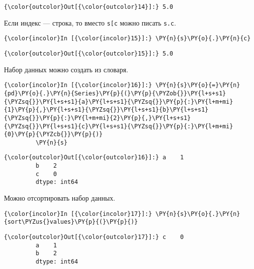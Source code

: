             \begin{Verbatim}[commandchars=\\\{\}]
{\color{outcolor}Out[{\color{outcolor}14}]:} 5.0
\end{Verbatim}
        
    Если индекс --- строка, то вместо
\texttt{s{[}\textquotesingle{}c\textquotesingle{}{]}} можно писать
\texttt{s.c}.

    \begin{Verbatim}[commandchars=\\\{\}]
{\color{incolor}In [{\color{incolor}15}]:} \PY{n}{s}\PY{o}{.}\PY{n}{c}
\end{Verbatim}

            \begin{Verbatim}[commandchars=\\\{\}]
{\color{outcolor}Out[{\color{outcolor}15}]:} 5.0
\end{Verbatim}
        
    Набор данных можно создать из словаря.

    \begin{Verbatim}[commandchars=\\\{\}]
{\color{incolor}In [{\color{incolor}16}]:} \PY{n}{s}\PY{o}{=}\PY{n}{pd}\PY{o}{.}\PY{n}{Series}\PY{p}{(}\PY{p}{\PYZob{}}\PY{l+s+s1}{\PYZsq{}}\PY{l+s+s1}{a}\PY{l+s+s1}{\PYZsq{}}\PY{p}{:}\PY{l+m+mi}{1}\PY{p}{,}\PY{l+s+s1}{\PYZsq{}}\PY{l+s+s1}{b}\PY{l+s+s1}{\PYZsq{}}\PY{p}{:}\PY{l+m+mi}{2}\PY{p}{,}\PY{l+s+s1}{\PYZsq{}}\PY{l+s+s1}{c}\PY{l+s+s1}{\PYZsq{}}\PY{p}{:}\PY{l+m+mi}{0}\PY{p}{\PYZcb{}}\PY{p}{)}
         \PY{n}{s}
\end{Verbatim}

            \begin{Verbatim}[commandchars=\\\{\}]
{\color{outcolor}Out[{\color{outcolor}16}]:} a    1
         b    2
         c    0
         dtype: int64
\end{Verbatim}
        
    Можно отсортировать набор данных.

    \begin{Verbatim}[commandchars=\\\{\}]
{\color{incolor}In [{\color{incolor}17}]:} \PY{n}{s}\PY{o}{.}\PY{n}{sort\PYZus{}values}\PY{p}{(}\PY{p}{)}
\end{Verbatim}

            \begin{Verbatim}[commandchars=\\\{\}]
{\color{outcolor}Out[{\color{outcolor}17}]:} c    0
         a    1
         b    2
         dtype: int64
\end{Verbatim}
        
